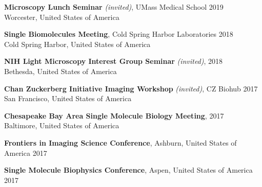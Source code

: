 \documentclass[margin,line]{res}
\begin{document}
\begin{resume}
\vspace*{-2.5mm}
{\bf Microscopy Lunch Seminar} {\it (invited)}, UMass Medical School \hfill 2019\\
 Worcester, United States of America%

\vspace*{-2.5mm}
{\bf Single Biomolecules Meeting}, Cold Spring Harbor Laboratories  \hfill 2018\\
Cold Spring Harbor, United States of America %

\vspace*{-2.5mm}
{\bf NIH Light Microscopy Interest Group Seminar} {\it (invited)},   \hfill 2018\\
 Bethesda, United States of America %

\vspace*{-2.5mm}
{\bf Chan Zuckerberg Initiative Imaging Workshop} {\it (invited)}, CZ Biohub \hfill 2017\\
 San Francisco, United States of America%

\vspace*{-2.5mm}
{\bf Chesapeake Bay Area Single Molecule Biology Meeting},  \hfill 2017\\
Baltimore, United States of America%

\vspace*{-2.5mm}
{\bf Frontiers in Imaging Science Conference}, Ashburn, United States of America \hfill 2017%

\vspace*{-2.5mm}
{\bf Single Molecule Biophysics Conference}, Aspen, United States of America \hfill 2017%


\end{resume}
\end{document}
